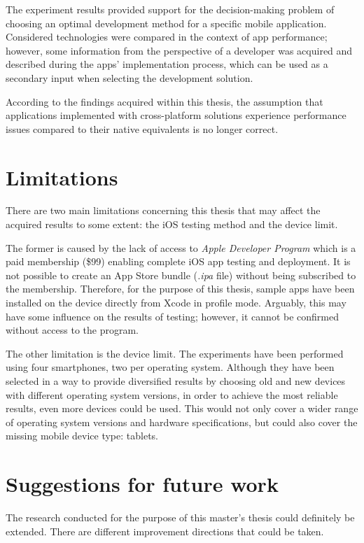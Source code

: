 The experiment results provided support for the decision-making problem of choosing an optimal development method for a specific mobile application. Considered technologies were compared in the context of app performance; however, some information from the perspective of a developer was acquired and described during the apps' implementation process, which can be used as a secondary input when selecting the development solution.

According to the findings acquired within this thesis, the assumption that applications implemented with cross-platform solutions experience performance issues compared to their native equivalents is no longer correct.

\section{Limitations}

There are two main limitations concerning this thesis that may affect the acquired results to some extent: the iOS testing method and the device limit.

The former is caused by the lack of access to \emph{Apple Developer Program} which is a paid membership (\$99) enabling complete iOS app testing and deployment. It is not possible to create an App Store bundle (\emph{.ipa} file) without being subscribed to the membership. Therefore, for the purpose of this thesis, sample apps have been installed on the device directly from Xcode in profile mode. Arguably, this may have some influence on the results of testing; however, it cannot be confirmed without access to the program.

The other limitation is the device limit. The experiments have been performed using four smartphones, two per operating system. Although they have been selected in a way to provide diversified results by choosing old and new devices with different operating system versions, in order to achieve the most reliable results, even more devices could be used. This would not only cover a wider range of operating system versions and hardware specifications, but could also cover the missing mobile device type: tablets.

\section{Suggestions for future work}

The research conducted for the purpose of this master's thesis could definitely be extended. There are different improvement directions that could be taken.

